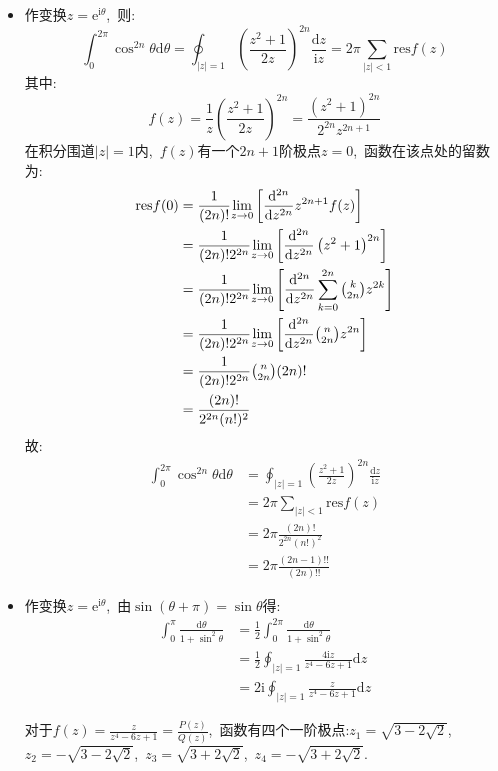 \documentclass[a4paper,fontset=windows]{ctexart}
\begin{document}
\begin{itemize}
\bigskip
\item[5.(1)]
作变换$z=\mathrm{e}^{\mathrm{i}\theta}$,\ 则:
\[
\int_{0}^{2\pi}\cos^{2n}\theta \mathrm{d}\theta
=\oint_{|z|=1}\left( \frac{z^2+1}{2z}\right) ^{2n}\frac{\mathrm{d}z}{\mathrm{i}z}
=2\pi\sum_{|z|<1}\mathrm{res}f(z)
\]
其中:
\[
f(z)
=\frac{1}{z}\left( \frac{z^2+1}{2z}\right) ^{2n}
=\frac{\left( z^2+1\right) ^{2n}}{2^{2n}z^{2n+1}} 
\]
在积分围道$|z|=1$内,\ $f(z)$有一个$2n+1$阶极点$z=0$,\ 函数在该点处的留数为:
\begin{align*}
\mathrm{res}f(0)
&=\frac{1}{(2n)!}{\lim_{z \to 0}}\left[\frac{\mathrm{d}^{2n}}{\mathrm{d}z^{2n}}z^{2n+1}f(z)\right] \\
&=\frac{1}{(2n)!2^{2n}}{\lim_{z \to 0}}\left[\frac{\mathrm{d}^{2n}}{\mathrm{d}z^{2n}}\left(z^2+1\right) ^{2n}\right] \\
&=\frac{1}{(2n)!2^{2n}}{\lim_{z \to 0}}\left[\frac{\mathrm{d}^{2n}}{\mathrm{d}z^{2n}}\sum_{k=0}^{2n}\tbinom{k}{2n}z^{2k}\right] \\
&=\frac{1}{(2n)!2^{2n}}{\lim_{z \to 0}}\left[\frac{\mathrm{d}^{2n}}{\mathrm{d}z^{2n}}\tbinom{n}{2n}z^{2n}\right] \\
&=\frac{1}{(2n)!2^{2n}}\tbinom{n}{2n}(2n)! \\
&=\frac{(2n)!}{2^{2n}(n!)^2}
\end{align*}
故:
\begin{align*}
\int_{0}^{2\pi}\cos^{2n}\theta \mathrm{d}\theta
&=\oint_{|z|=1}\left( \frac{z^2+1}{2z}\right) ^{2n}\frac{\mathrm{d}z}{\mathrm{i}z} \\
&=2\pi\sum_{|z|<1}\mathrm{res}f(z) \\
&=2\pi\frac{(2n)!}{2^{2n}(n!)^2} \\
&=2\pi\frac{(2n-1)!!}{(2n)!!}
\end{align*}

\smallskip
\item[5.(3)]
作变换$z=\mathrm{e}^{\mathrm{i}\theta}$,\ 由$\sin(\theta+\pi)=\sin\theta$得:
\begin{align*}
\int_{0}^{\pi}\frac{\mathrm{d}\theta}{1+\sin^2\theta}
&=\frac{1}{2}\int_{0}^{2\pi}\frac{\mathrm{d}\theta}{1+\sin^2\theta} \\
&=\frac{1}{2}\oint_{|z|=1}\frac{4\mathrm{i}z}{z^4-6z+1}\mathrm{d}z \\
&=2\mathrm{i}\oint_{|z|=1}\frac{z}{z^4-6z+1}\mathrm{d}z
\end{align*}

对于$f(z)=\frac{z}{z^4-6z+1}=\frac{P(z)}{Q(z)}$,\ 函数有四个一阶极点:$z_1=\sqrt{3-2\sqrt2}$,\ $z_2=-\sqrt{3-2\sqrt2}$,\ $z_3=\sqrt{3+2\sqrt2}$,\ $z_4=-\sqrt{3+2\sqrt2}$.


\end{itemize}
\end{document}
